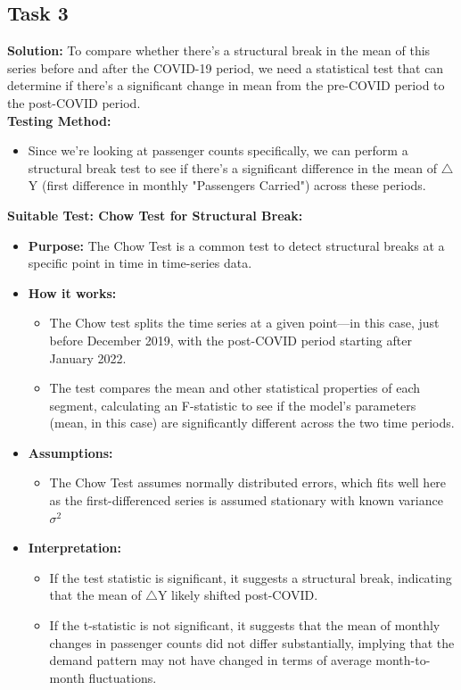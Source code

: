 \documentclass[12pt]{article}
\begin{document}
\subsection{Task 3}
\textbf{Solution: } \newline
To compare whether there’s a structural break in the mean of this series before and after the COVID-19 period, we need a statistical test that can determine if there’s a significant change in mean from the pre-COVID period to the post-COVID period.\\
\textbf{Testing Method:}
\begin{itemize}
    \item Since we're looking at passenger counts specifically, we can perform a structural break test to see if there’s a significant difference in the mean of $\triangle$Y (first difference in monthly "Passengers Carried") across these periods.
\end{itemize}
\textbf{Suitable Test: Chow Test for Structural Break:}
\begin{itemize}
    \item \textbf{Purpose:} The Chow Test is a common test to detect structural breaks at a specific point in time in time-series data.
    \item \textbf{How it works:}
    \begin{itemize}
        \item The Chow test splits the time series at a given point—in this case, just before December 2019, with the post-COVID period starting after January 2022.
        \item The test compares the mean and other statistical properties of each segment, calculating an F-statistic to see if the model’s parameters (mean, in this case) are significantly different across the two time periods.
    \end{itemize}
    \item  \textbf{Assumptions:}
    \begin{itemize}
        \item The Chow Test assumes normally distributed errors, which fits well here as the first-differenced series is assumed stationary with known variance $\sigma^2$
    \end{itemize}
    \item \textbf{Interpretation:}
    \begin{itemize}
        \item If the test statistic is significant, it suggests a structural break, indicating that the mean of $\triangle$Y likely shifted post-COVID.
        \item  If the t-statistic is not significant, it suggests that the mean of monthly changes in passenger counts did not differ substantially, implying that the demand pattern may not have changed in terms of average month-to-month fluctuations.
    \end{itemize}
\end{itemize}
\end{document}
